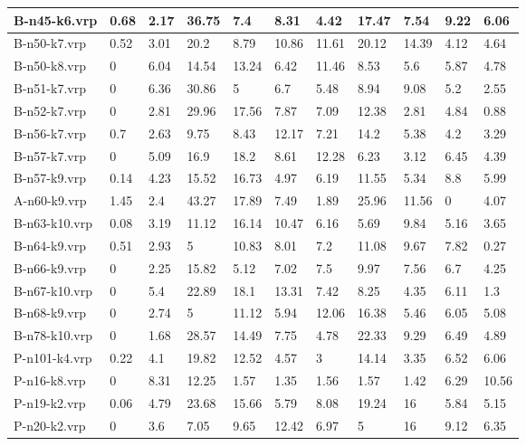 \begin{table}[!ht]
\begin{tabular}{|l|l|l|l|l|l|l|l|l|l|l|}
        B-n45-k6.vrp & 0.68 & 2.17 & 36.75 & 7.4 & 8.31 & 4.42 & 17.47 & 7.54 & 9.22 & 6.06 \\ \hline
        B-n50-k7.vrp & 0.52 & 3.01 & 20.2 & 8.79 & 10.86 & 11.61 & 20.12 & 14.39 & 4.12 & 4.64 \\ \hline
        B-n50-k8.vrp & 0 & 6.04 & 14.54 & 13.24 & 6.42 & 11.46 & 8.53 & 5.6 & 5.87 & 4.78 \\ \hline
        B-n51-k7.vrp & 0 & 6.36 & 30.86 & 5 & 6.7 & 5.48 & 8.94 & 9.08 & 5.2 & 2.55 \\ \hline
        B-n52-k7.vrp & 0 & 2.81 & 29.96 & 17.56 & 7.87 & 7.09 & 12.38 & 2.81 & 4.84 & 0.88 \\ \hline
        B-n56-k7.vrp & 0.7 & 2.63 & 9.75 & 8.43 & 12.17 & 7.21 & 14.2 & 5.38 & 4.2 & 3.29 \\ \hline
        B-n57-k7.vrp & 0 & 5.09 & 16.9 & 18.2 & 8.61 & 12.28 & 6.23 & 3.12 & 6.45 & 4.39 \\ \hline
        B-n57-k9.vrp & 0.14 & 4.23 & 15.52 & 16.73 & 4.97 & 6.19 & 11.55 & 5.34 & 8.8 & 5.99 \\ \hline
        A-n60-k9.vrp & 1.45 & 2.4 & 43.27 & 17.89 & 7.49 & 1.89 & 25.96 & 11.56 & 0 & 4.07 \\ \hline
        B-n63-k10.vrp & 0.08 & 3.19 & 11.12 & 16.14 & 10.47 & 6.16 & 5.69 & 9.84 & 5.16 & 3.65 \\ \hline
        B-n64-k9.vrp & 0.51 & 2.93 & 5 & 10.83 & 8.01 & 7.2 & 11.08 & 9.67 & 7.82 & 0.27 \\ \hline
        B-n66-k9.vrp & 0 & 2.25 & 15.82 & 5.12 & 7.02 & 7.5 & 9.97 & 7.56 & 6.7 & 4.25 \\ \hline
        B-n67-k10.vrp & 0 & 5.4 & 22.89 & 18.1 & 13.31 & 7.42 & 8.25 & 4.35 & 6.11 & 1.3 \\ \hline
        B-n68-k9.vrp & 0 & 2.74 & 5 & 11.12 & 5.94 & 12.06 & 16.38 & 5.46 & 6.05 & 5.08 \\ \hline
        B-n78-k10.vrp & 0 & 1.68 & 28.57 & 14.49 & 7.75 & 4.78 & 22.33 & 9.29 & 6.49 & 4.89 \\ \hline
        P-n101-k4.vrp & 0.22 & 4.1 & 19.82 & 12.52 & 4.57 & 3 & 14.14 & 3.35 & 6.52 & 6.06 \\ \hline
        P-n16-k8.vrp & 0 & 8.31 & 12.25 & 1.57 & 1.35 & 1.56 & 1.57 & 1.42 & 6.29 & 10.56 \\ \hline
        P-n19-k2.vrp & 0.06 & 4.79 & 23.68 & 15.66 & 5.79 & 8.08 & 19.24 & 16 & 5.84 & 5.15 \\ \hline
        P-n20-k2.vrp & 0 & 3.6 & 7.05 & 9.65 & 12.42 & 6.97 & 5 & 16 & 9.12 & 6.35 \\ \hline

\end{tabular}
\end{table}

